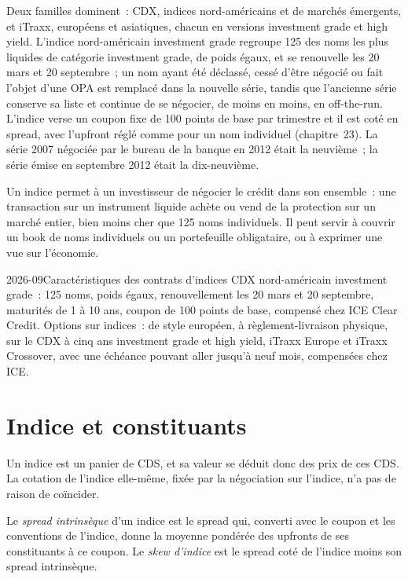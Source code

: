 Deux familles dominent~: CDX, indices nord-américains et de marchés émergents, et iTraxx,
européens et asiatiques, chacun en versions investment grade et high yield. L'indice
nord-américain investment grade regroupe 125 des noms les plus liquides de catégorie investment grade,
de poids égaux, et se renouvelle les 20 mars et 20 septembre~; un nom ayant
été déclassé, cessé d'être négocié ou fait l'objet d'une OPA est remplacé dans la nouvelle série,
tandis que l'ancienne série conserve sa liste et continue de se négocier, de moins en moins, en off-the-run.
L'indice verse un coupon fixe de 100 points de base par trimestre et il est coté en spread, avec
l'upfront réglé comme pour un nom individuel (chapitre~23). La série 2007 négociée par
le bureau de la banque en 2012 était la neuvième~; la série émise en septembre 2012 était la
dix-neuvième.

Un indice permet à un investisseur de négocier le crédit dans son ensemble~: une transaction sur un
instrument liquide achète ou vend de la protection sur un marché entier, bien moins cher que 125
noms individuels. Il peut servir à couvrir un book de noms individuels ou un portefeuille obligataire, ou à exprimer
une vue sur l'économie.

\begin{dated}{2026-09}{Caractéristiques des contrats d'indices}\label{dat:m2:credit-indices-and-tranches:indices}
CDX nord-américain investment grade~: 125 noms, poids égaux, renouvellement les 20 mars et
20 septembre, maturités de 1 à 10 ans, coupon de 100 points de base, compensé chez ICE Clear
Credit. Options sur indices~: de style européen, à règlement-livraison physique, sur le CDX à cinq ans
investment grade et high yield, iTraxx Europe et iTraxx Crossover, avec une échéance
pouvant aller jusqu'à neuf mois, compensées chez ICE.
\end{dated}

\section{Indice et constituants}

Un indice est un panier de CDS, et sa valeur se déduit donc des prix de ces CDS.
La cotation de l'indice elle-même, fixée par la négociation sur l'indice, n'a pas de raison de coïncider.

\begin{definition}\label{def:m2:credit-indices-and-tranches:intrinsic}
Le \emph{spread intrinsèque} d'un indice est le spread qui,
converti avec le coupon et les conventions de l'indice, donne la moyenne pondérée des
upfronts de ses constituants à ce coupon. Le \emph{skew d'indice} est le
spread coté de l'indice moins son spread intrinsèque.
\end{definition}


